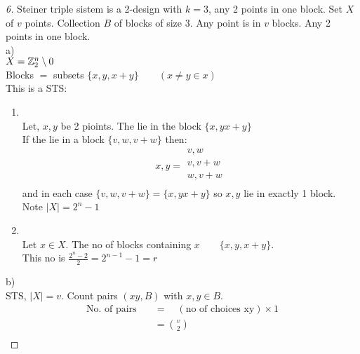 \documentclass[]{amsart}
\theoremstyle{definition}
\theoremstyle{remark}
\numberwithin{equation}{section}
\begin{document}
\begin{proof}[6]
	Steiner triple sistem is a 2-design with $k=3$, any 2 points in one block. \newline
	Set $X$ of $v$ points. Collection $B$ of blocks of size $3$. Any point is in $v$ blocks. Any 2 points in one block.\\
	a)\hfill \\
		$X = \mathbb{Z}_2^n \setminus 0$ \\
		Blocks $=$ subsets $\{x,y, x+y\} \qquad (x\neq y \in x)$ \\
		This is a STS:
			\begin{enumerate}
				\item \hfill \\
				Let, $x,y$ be 2 pioints. The lie in the block $\{x,y x+y\}$\\
				If the lie in a block $\{v,w, v+w\}$ then:\\
				\[
				x,y = \begin{matrix}
						v, w \\
						v, v+w \\
						w, v+w \\
					  \end{matrix}
				\]
				and in each case $\{v,w, v+w\} = \{x,y x+y\} $ so $x,y$ lie in exactly 1 block. Note $|X| = 2^n -1 $
				\item \hfill \\
				Let $x \in X$. The no of blocks containing $x\qquad \{x,y, x+y\}$.\\ 
				This no is $\frac{2^n-2}{2} = 2^{n-1}-1 = r$
			\end{enumerate}
	b)\hfill \\
	STS, $|X| = v$. Count pairs $(xy, B)$ with $x,y \in B$.\\
	\begin{align*}
		\text{No. of pairs} \quad &= \quad (\text{no of choices xy})\times 1 \\
								  &= {v \choose 2}\\
	\end{align*}


\end{proof}
\end{document}
